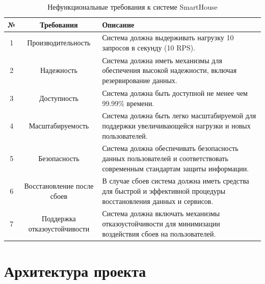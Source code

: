 \documentclass{article}
\begin{document}
\begin{table}[H]
    \centering
    \begin{tabular}{|c|c|p{7cm}|}
    \hline
        № & Требования & Описание \\ \hline
        1 & Производительность & Система должна выдерживать нагрузку 10 запросов в секунду (10 RPS). \\ \hline
        2 & Надежность & Система должна иметь механизмы для обеспечения высокой надежности, включая резервирование данных. \\ \hline
        3 & Доступность & Система должна быть доступной не менее чем 99.99\% времени. \\ \hline
        4 & Масштабируемость & Система должна быть легко масштабируемой для поддержки увеличивающейся нагрузки и новых пользователей. \\ \hline
        5 & Безопасность & Система должна обеспечивать безопасность данных пользователей и соответствовать современным стандартам защиты информации. \\ \hline
        6 & Восстановление после сбоев & В случае сбоев система должна иметь средства для быстрой и эффективной процедуры восстановления данных и сервисов. \\ \hline
        7 & Поддержка отказоустойчивости & Система должна включать механизмы отказоустойчивости для минимизации воздействия сбоев на пользователей. \\ \hline
    \end{tabular}
    \caption{Нефункциональные требования к системе SmartHouse}
\end{table}

\section{Архитектура проекта}
\end{document}

